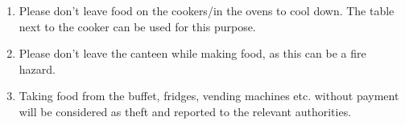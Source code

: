 \documentclass{article}
\begin{document}
{\begin{enumerate}
\item Please don't leave food on the cookers/in the ovens to cool down. The
table next to the cooker can be used for this purpose.

\item Please don't leave the canteen while making food, as this can be a fire
hazard.

\item Taking food from the buffet, fridges, vending machines etc. without
payment will be considered as theft and reported to the relevant authorities.

\end{enumerate}

}

\underskriv
\end{document}
